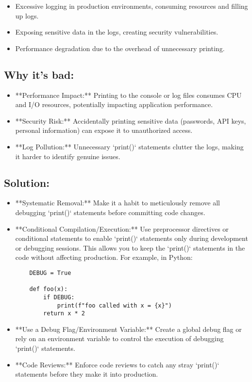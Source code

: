 \documentclass{article}
\begin{document}
\begin{itemize}
    \item Excessive logging in production environments, consuming resources and filling up logs.
    \item Exposing sensitive data in the logs, creating security vulnerabilities.
    \item  Performance degradation due to the overhead of unnecessary printing.
\end{itemize}

\subsection*{Why it's bad:}

\begin{itemize}
    \item **Performance Impact:**  Printing to the console or log files consumes CPU and I/O resources, potentially impacting application performance.
    \item **Security Risk:**  Accidentally printing sensitive data (passwords, API keys, personal information) can expose it to unauthorized access.
    \item **Log Pollution:**  Unnecessary `print()` statements clutter the logs, making it harder to identify genuine issues.
\end{itemize}

\subsection*{Solution:}

\begin{itemize}
    \item **Systematic Removal:**  Make it a habit to meticulously remove all debugging `print()` statements before committing code changes.
    \item **Conditional Compilation/Execution:** Use preprocessor directives or conditional statements to enable `print()` statements only during development or debugging sessions.  This allows you to keep the `print()` statements in the code without affecting production.  For example, in Python:
    \begin{verbatim}
    DEBUG = True

    def foo(x):
        if DEBUG:
            print(f"foo called with x = {x}")
        return x * 2
    \end{verbatim}
    \item **Use a Debug Flag/Environment Variable:**  Create a global debug flag or rely on an environment variable to control the execution of debugging `print()` statements.
    \item **Code Reviews:** Enforce code reviews to catch any stray `print()` statements before they make it into production.
\end{itemize}
\end{document}
